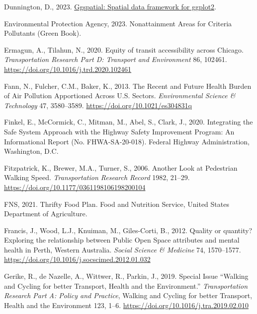 \documentclass[
  letterpaper,
  DIV=11,
  numbers=noendperiod]{scrreport}
\newlength{\cslhangindent}
\newlength{\cslentryspacingunit} %
\newenvironment{CSLReferences}[2] %
 {%
  \setlength{\parindent}{0pt}
  \ifodd #1
  \let\oldpar\par
  \def\par{\hangindent=\cslhangindent\oldpar}
  \fi
  \setlength{\parskip}{#2\cslentryspacingunit}
 }%
 {}
\begin{document}
\begin{CSLReferences}{1}{0}
\leavevmode{}%
Dunnington, D., 2023.
\href{https://CRAN.R-project.org/package=ggspatial}{Ggspatial: Spatial
data framework for ggplot2}.

\leavevmode{}%
Environmental Protection Agency, 2023. Nonattainment {Areas} for
{Criteria Pollutants} ({Green Book}).

\leavevmode{}%
Ermagun, A., Tilahun, N., 2020. Equity of transit accessibility across
{Chicago}. \emph{Transportation Research Part D: Transport and
Environment} 86, 102461. \url{https://doi.org/10.1016/j.trd.2020.102461}

\leavevmode{}%
Fann, N., Fulcher, C.M., Baker, K., 2013. The {Recent} and {Future
Health Burden} of {Air Pollution Apportioned Across U}.{S}. {Sectors}.
\emph{Environmental Science \& Technology} 47, 3580--3589.
\url{https://doi.org/10.1021/es304831q}

\leavevmode{}%
Finkel, E., McCormick, C., Mitman, M., Abel, S., Clark, J., 2020.
Integrating the {Safe System Approach} with the {Highway Safety
Improvement Program}: {An Informational Report} (No. FHWA-SA-20-018).
{Federal Highway Administration}, {Washington, D.C}.

\leavevmode{}%
Fitzpatrick, K., Brewer, M.A., Turner, S., 2006. Another {Look} at
{Pedestrian Walking Speed}. \emph{Transportation Research Record} 1982,
21--29. \url{https://doi.org/10.1177/0361198106198200104}

\leavevmode{}%
FNS, 2021. Thrifty {Food Plan}. {Food and Nutrition Service, United
States Department of Agriculture}.

\leavevmode{}%
Francis, J., Wood, L.J., Knuiman, M., Giles-Corti, B., 2012. Quality or
quantity? {Exploring} the relationship between {Public Open Space}
attributes and mental health in {Perth}, {Western Australia}.
\emph{Social Science \& Medicine} 74, 1570--1577.
\url{https://doi.org/10.1016/j.socscimed.2012.01.032}

\leavevmode{}%
Gerike, R., de Nazelle, A., Wittwer, R., Parkin, J., 2019. Special
{Issue} {``{Walking} and {Cycling} for better {Transport}, {Health} and
the {Environment}.''} \emph{Transportation Research Part A: Policy and
Practice}, Walking and {Cycling} for better {Transport}, {Health} and
the {Environment} 123, 1--6.
\url{https://doi.org/10.1016/j.tra.2019.02.010}


\end{CSLReferences}
\end{document}
